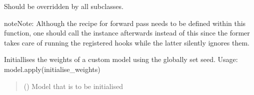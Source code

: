 \documentclass[a4paper,10pt,english]{report}
\begin{document}
\begin{fulllineitems}
\begin{fulllineitems}
\sphinxAtStartPar
Should be overridden by all subclasses.

\begin{sphinxadmonition}{note}{Note:}
\sphinxAtStartPar
Although the recipe for forward pass needs to be defined within
this function, one should call the  instance afterwards
instead of this since the former takes care of running the
registered hooks while the latter silently ignores them.
\end{sphinxadmonition}

\end{fulllineitems}


\begin{fulllineitems}
\label{\detokenize{NNucleate:NNucleate.models.NNCV.training}}
\pysigstartsignatures
{}
\pysigstopsignatures
\end{fulllineitems}


\end{fulllineitems}


\begin{fulllineitems}
\label{\detokenize{NNucleate:NNucleate.models.initialise_weights}}
\pysigstartsignatures
{}
\pysigstopsignatures
\sphinxAtStartPar
Initiallises the weights of a custom model using the globally set seed.
Usage:
model.apply(initialise\_weights)
\begin{quote}\begin{description}
\sphinxAtStartPar
{} () \textendash{} Model that is to be initialised

\end{description}\end{quote}

\end{fulllineitems}
\end{document}
